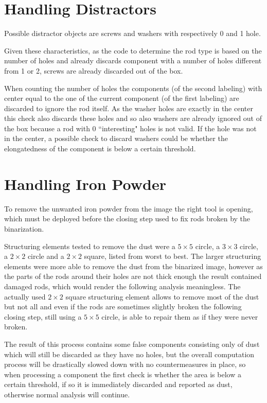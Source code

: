 \section{Handling Distractors}
Possible distractor objects are screws and washers with respectively 0 and 1 hole.

Given these characteristics, as the code to determine the rod type is based on the number of holes and already discards component with a number of holes different from 1 or 2, screws are already discarded out of the box.

When counting the number of holes the components (of the second labeling) with center equal to the one of the current component (of the first labeling) are discarded to ignore the rod itself.
As the washer holes are exactly in the center this check also discards these holes and so also washers are already ignored out of the box because a rod with 0 ``interesting" holes is not valid.
If the hole was not in the center, a possible check to discard washers could be whether the elongatedness of the component is below a certain threshold.

\section{Handling Iron Powder}
To remove the unwanted iron powder from the image the right tool is opening, which must be deployed before the closing step used to fix rods broken by the binarization.

Structuring elements tested to remove the dust were a $5\times 5$ circle, a $3\times 3$ circle, a $2\times 2$ circle and a $2\times 2$ square, listed from worst to best.
The larger structuring elements were more able to remove the dust from the binarized image, however as the parts of the rods around their holes are not thick enough the result contained damaged rods, which would render the following analysis meaningless.
The actually used $2\times 2$ square structuring element allows to remove most of the dust but not all and even if the rods are sometimes slightly broken the following closing step, still using a $5\times 5$ circle, is able to repair them as if they were never broken.

The result of this process contains some false components consisting only of dust which will still be discarded as they have no holes, but the overall computation process will be drastically slowed down with no countermeasures in place, so when processing a component the first check is whether the area is below a certain threshold, if so it is immediately discarded and reported as dust, otherwise normal analysis will continue.


